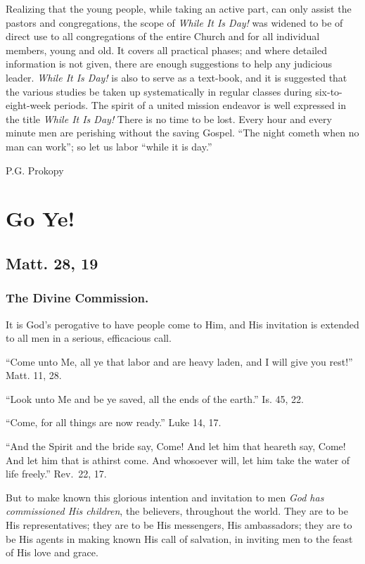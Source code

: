 \documentclass[
]{book}
\begin{document}
Realizing that the young people, while taking an active part, can only assist the pastors and congregations, the scope of \emph{While It Is Day!} was widened to be of direct use to all congregations of the entire Church and for all individual members, young and old. It covers all practical phases; and where detailed information is not given, there are enough suggestions to help any judicious leader. \emph{While It Is Day!} is also to serve as a text-book, and it is suggested that the various studies be taken up systematically in regular classes during six-to-eight-week periods. The spirit of a united mission endeavor is well expressed in the title \emph{While It Is Day!} There is no time to be lost. Every hour and every minute men are perishing without the saving Gospel. ``The night cometh when no man can work''; so let us labor ``while it is day.''

P.G. Prokopy

\hypertarget{go-ye}{%
\chapter{Go Ye!}\label{go-ye}}

\hypertarget{matt.-28-19}{%
\section*{Matt. 28, 19}\label{matt.-28-19}}

\hypertarget{the-divine-commission.}{%
\subsection*{The Divine Commission.}\label{the-divine-commission.}}

It is God's perogative to have people come to Him, and His invitation is extended to all men in a serious, efficacious call.

``Come unto Me, all ye that labor and are heavy laden, and I will give you rest!'' Matt. 11, 28.

``Look unto Me and be ye saved, all the ends of the earth.'' Is. 45, 22.

``Come, for all things are now ready.'' Luke 14, 17.

``And the Spirit and the bride say, Come! And let him that heareth say, Come! And let him that is athirst come. And whosoever will, let him take the water of life freely.'' Rev.~22, 17.

But to make known this glorious intention and invitation to men \emph{God has commissioned His children}, the believers, throughout the world. They are to be His representatives; they are to be His messengers, His ambassadors; they are to be His agents in making known His call of salvation, in inviting men to the feast of His love and grace.
\end{document}
